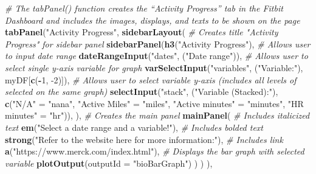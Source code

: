 \documentclass[]{book}
\newenvironment{Shaded}{\begin{snugshade}}{\end{snugshade}}
\newcommand{\KeywordTok}[1]{\textcolor[rgb]{0.13,0.29,0.53}{\textbf{#1}}}
\newcommand{\DataTypeTok}[1]{\textcolor[rgb]{0.13,0.29,0.53}{#1}}
\newcommand{\DecValTok}[1]{\textcolor[rgb]{0.00,0.00,0.81}{#1}}
\newcommand{\StringTok}[1]{\textcolor[rgb]{0.31,0.60,0.02}{#1}}
\newcommand{\CommentTok}[1]{\textcolor[rgb]{0.56,0.35,0.01}{\textit{#1}}}
\newcommand{\OperatorTok}[1]{\textcolor[rgb]{0.81,0.36,0.00}{\textbf{#1}}}
\newcommand{\NormalTok}[1]{#1}
\begin{document}
\begin{Shaded}
\begin{Highlighting}[]
{{             \CommentTok{# The tabPanel() function creates the “Activity Progress” tab in the Fitbit Dashboard and includes the images, displays, and texts to be shown on the page}
             \KeywordTok{tabPanel}\NormalTok{(}\StringTok{"Activity Progress"}\NormalTok{,}
                      \KeywordTok{sidebarLayout}\NormalTok{(}
                        \CommentTok{# Creates title "Activity Progress" for sidebar panel}
                        \KeywordTok{sidebarPanel}\NormalTok{(}\KeywordTok{h3}\NormalTok{(}\StringTok{"Activity Progress"}\NormalTok{),}
                                     \CommentTok{# Allows user to input date range}
                                     \KeywordTok{dateRangeInput}\NormalTok{(}\StringTok{"dates"}\NormalTok{, (}\StringTok{"Date range"}\NormalTok{)),}
                                     \CommentTok{# Allows user to select single y-axis variable for graph}
                                     \KeywordTok{varSelectInput}\NormalTok{(}\StringTok{"variables"}\NormalTok{, (}\StringTok{"Variable:"}\NormalTok{), myDF[}\KeywordTok{c}\NormalTok{(}\OperatorTok{-}\DecValTok{1}\NormalTok{, }\DecValTok{-2}\NormalTok{)]),}
                                     \CommentTok{# Allows user to select variable y-axis (includes all levels of selected on the same graph)}
                                     \KeywordTok{selectInput}\NormalTok{(}\StringTok{"stack"}\NormalTok{, (}\StringTok{"Variable (Stacked):"}\NormalTok{),}
                                                 \KeywordTok{c}\NormalTok{(}\StringTok{"N/A"}\NormalTok{ =}\StringTok{ "nana"}\NormalTok{, }\StringTok{"Active Miles"}\NormalTok{ =}\StringTok{ "miles"}\NormalTok{, }\StringTok{"Active minutes"}\NormalTok{ =}\StringTok{ "minutes"}\NormalTok{, }\StringTok{"HR minutes"}\NormalTok{ =}\StringTok{ "hr"}\NormalTok{)),}
\NormalTok{                        ),}
                        \CommentTok{# Creates the main panel}
                        \KeywordTok{mainPanel}\NormalTok{(}
                          \CommentTok{# Includes italicized text}
                          \KeywordTok{em}\NormalTok{(}\StringTok{"Select a date range and a variable!"}\NormalTok{),}
                          \CommentTok{# Includes bolded text}
                          \KeywordTok{strong}\NormalTok{(}\StringTok{"Refer to the website here for more information:"}\NormalTok{),}
                          \CommentTok{# Includes link}
                          \KeywordTok{a}\NormalTok{(}\StringTok{"https://www.merck.com/index.html"}\NormalTok{),}
                          \CommentTok{# Displays the bar graph with selected variable}
                          \KeywordTok{plotOutput}\NormalTok{(}\DataTypeTok{outputId =} \StringTok{"bioBarGraph"}\NormalTok{)}
\NormalTok{                        )}
\NormalTok{                      )}
\NormalTok{             ), }
             
}}
\end{Highlighting}
\end{Shaded}
\end{document}
